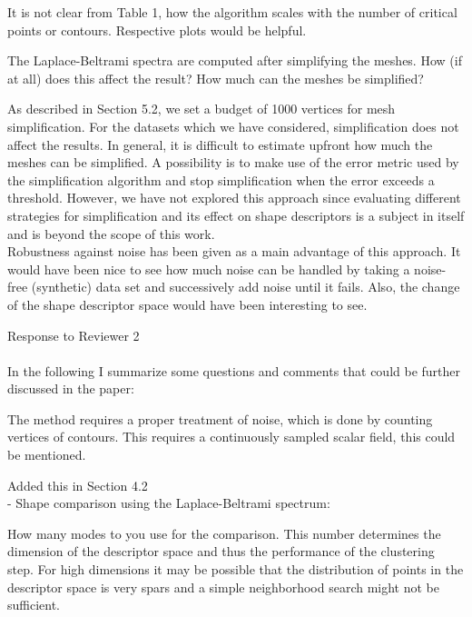 \documentclass[10pt]{article}
\begin{document}
   It is not clear from Table 1, how the algorithm scales with the number
   of critical points or contours. Respective plots would be helpful.

   The Laplace-Beltrami spectra are computed after simplifying the meshes.
   How (if at all) does this affect the result? How much can the meshes be
   simplified?

   {\color{blue}As described in Section 5.2, we set a budget of 1000 vertices
	   for mesh simplification. For the datasets which we have considered,
	   simplification does not affect the results. In general, it is difficult
	   to estimate upfront how much the meshes can be simplified. A possibility
	   is to make use of the error metric used by the simplification algorithm
	   and stop simplification when the error exceeds a threshold. However, we have
	   not explored this approach since evaluating different strategies for simplification
	   and its effect on shape descriptors is a subject in itself and is beyond the scope
   of this work.}\\

   Robustness against noise has been given as a main advantage of this
   approach. It would have been nice to see how much noise can be handled by
   taking a noise-free (synthetic) data set and successively add noise until
   it fails. Also, the change of the shape descriptor space would have been
   interesting to see.



{\noindent \LARGE Response to Reviewer 2}\\\\

	In the following I summarize some questions and comments that could be
   further discussed in the paper:

   The method requires a proper treatment of noise, which is done by
   counting vertices of contours. This requires a continuously sampled
   scalar field, this could be mentioned.

   {\color{blue}Added this in Section 4.2}\\

   - Shape comparison using the Laplace-Beltrami spectrum:

   How many modes to you use for the comparison. This number determines
   the dimension of the descriptor space and thus the performance of the
   clustering step. For high dimensions it may be possible that the
   distribution of points in the descriptor space is very spars and a simple
   neighborhood search might not be sufficient. 
\end{document}
